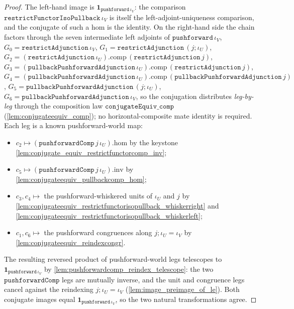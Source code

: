 \begin{proof}
  The left-hand image is \(\mathbf{1}_{\mathtt{pushforward}\,\iota_V}\): the comparison
  \(\mathtt{restrictFunctorIsoPullback}\,\iota_V\) is itself the left-adjoint-uniqueness comparison,
  and the conjugate of such a hom is the identity. On the right-hand side the chain factors through
  the seven intermediate left adjoints of \(\mathtt{pushforward}\,\iota_V\),
  \(G_0 = \mathtt{restrictAdjunction}\,\iota_V\),
  \(G_1 = \mathtt{restrictAdjunction}\,(j \mathbin{;} \iota_U)\),
  \(G_2 = (\mathtt{restrictAdjunction}\,\iota_U).\mathrm{comp}\,(\mathtt{restrictAdjunction}\,j)\),
  \(G_3 = (\mathtt{pullbackPushforwardAdjunction}\,\iota_U).\mathrm{comp}\,(\mathtt{restrictAdjunction}\,j)\),
  \(G_4 = (\mathtt{pullbackPushforwardAdjunction}\,\iota_U).\mathrm{comp}\,(\mathtt{pullbackPushforwardAdjunction}\,j)\),
  \(G_5 = \mathtt{pullbackPushforwardAdjunction}\,(j \mathbin{;} \iota_U)\),
  \(G_6 = \mathtt{pullbackPushforwardAdjunction}\,\iota_V\), so the conjugation distributes
  \emph{leg-by-leg} through the composition law \(\mathtt{conjugateEquiv\_comp}\)
  (\cref{lem:conjugateequiv_comp}); no horizontal-composite mate identity is required. Each leg is a
  known pushforward-world map:
  \begin{itemize}
    \item \(c_2 \mapsto (\mathtt{pushforwardComp}\,j\,\iota_U).\mathrm{hom}\) by the keystone
      \cref{lem:conjugate_equiv_restrictfunctorcomp_inv};
    \item \(c_5 \mapsto (\mathtt{pushforwardComp}\,j\,\iota_U).\mathrm{inv}\) by
      \cref{lem:conjugateequiv_pullbackcomp_hom};
    \item \(c_3, c_4 \mapsto\) the pushforward-whiskered units of \(\iota_U\) and \(j\) by
      \cref{lem:conjugateequiv_restrictfunctorisopullback_whiskerright} and
      \cref{lem:conjugateequiv_restrictfunctorisopullback_whiskerleft};
    \item \(c_1, c_6 \mapsto\) the pushforward congruences along
      \(j \mathbin{;} \iota_U = \iota_V\) by \cref{lem:conjugateequiv_reindexcongr}.
  \end{itemize}
  The resulting reversed product of pushforward-world legs telescopes to
  \(\mathbf{1}_{\mathtt{pushforward}\,\iota_V}\) by \cref{lem:pushforwardcomp_reindex_telescope}: the
  two \(\mathtt{pushforwardComp}\) legs are mutually inverse, and the unit and congruence legs cancel
  against the reindexing \(j \mathbin{;} \iota_U = \iota_V\) (\cref{lem:image_preimage_of_le}). Both
  conjugate images equal \(\mathbf{1}_{\mathtt{pushforward}\,\iota_V}\), so the two natural
  transformations agree.
\end{proof}

